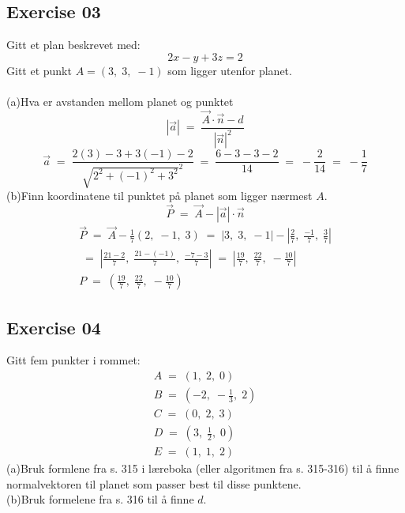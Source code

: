 \documentclass[12pt, a4paper]{article}
\begin{document}
\newpage\quad			
\subsection*{Exercise 03}
Gitt et plan beskrevet med:
	\begin{equation}
		\tag*{}
		2x-y+3z=2
	\end{equation}
Gitt et punkt $A=(3,\;3,\;-1)$ som ligger utenfor planet.\\\\
	(a)\quad Hva er avstanden mellom planet og punktet
			\begin{equation}
				\tag*{}
					|\vec{a}|\;=\;\frac{\vec{A}\cdot\vec{n}-d}
					{\left|\vec{n}\right|^2}
			\end{equation}
			\begin{equation}
				\tag*{}
					\vec{a}\;=\;\frac{2(3)-3+3(-1)-2}
					{\sqrt{2^2+(-1)^2+3^2}^2}\;=\;
					\frac{6-3-3-2}{14}\;=\;
					-\frac{2}{14}\;=\;-\frac{1}{7}
			\end{equation}
	(b)\quad Finn koordinatene til punktet på planet som
	ligger nærmest $A$.
			\begin{equation}
				\tag*{}
					\vec{P}\;=\;\vec{A}-|\vec{a}|\cdot\vec{n}
			\end{equation}
			\begin{gather}
				\tag*{}
					\vec{P}\;=\;\vec{A}-\frac{1}{7}(2,\;-1,\;3)
					\;=\;|3,\;3,\;-1|-\left|
						\frac{2}{7},\;
						\frac{-1}{7},\;
						\frac{3}{7}
					\right|\\
				\tag*{}
					\;=\;\left|
						\frac{21-2}{7},\;
						\frac{21-(-1)}{7},\;
						\frac{-7-3}{7}
					\right|\;=\;\left|
						\frac{19}{7},\;
						\frac{22}{7},\;
						-\frac{10}{7}
					\right|\\
				\tag*{}
					P\;=\;\left(
						\frac{19}{7},\;
						\frac{22}{7},\;
						-\frac{10}{7}
					\right)
			\end{gather}
			
\subsection*{Exercise 04}
Gitt fem punkter i rommet:
	\begin{gather}
		\tag*{}
			A\;=\;(1,\;2,\;0)\\
		\tag*{}
			B\;=\;\left(-2,\;-\frac{1}{3},\;2\right)\\
		\tag*{}
			C\;=\;(0,\;2,\;3)\\
		\tag*{}
			D\;=\;\left(3,\;\frac{1}{2},\;0\right)\\
		\tag*{}
			E\;=\;(1,\;1,\;2)
	\end{gather}
	(a)\quad Bruk formlene fra s. 315 i læreboka (eller
	algoritmen fra s. 315-316) til å finne normalvektoren til
	planet som passer best til disse punktene.
			\begin{equation}
				\tag*{}
			\end{equation}
	(b)\quad Bruk formelene fra s. 316 til å finne $d$.
			\begin{equation}
				\tag*{}
			\end{equation}
	
\end{document}
